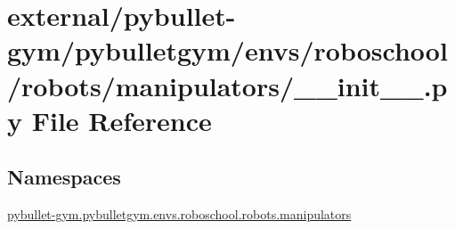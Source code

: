 \hypertarget{external_2pybullet-gym_2pybulletgym_2envs_2roboschool_2robots_2manipulators_2____init_____8py}{}\section{external/pybullet-\/gym/pybulletgym/envs/roboschool/robots/manipulators/\+\_\+\+\_\+init\+\_\+\+\_\+.py File Reference}
\label{external_2pybullet-gym_2pybulletgym_2envs_2roboschool_2robots_2manipulators_2____init_____8py}
\subsection*{Namespaces}
\begin{DoxyCompactItemize}
\item 
 \hyperlink{namespacepybullet-gym_1_1pybulletgym_1_1envs_1_1roboschool_1_1robots_1_1manipulators}{pybullet-\/gym.\+pybulletgym.\+envs.\+roboschool.\+robots.\+manipulators}
\end{DoxyCompactItemize}
